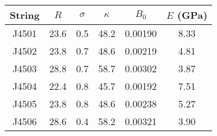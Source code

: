 \begin{tabular}{cccccc}
\toprule
String & $R$ & $\sigma$ & $\kappa$ & $B_0$ & $E$ (GPa) \\
\midrule
J4501 & 23.6 & 0.5 & 48.2 & 0.00190 & 8.33 \\
J4502 & 23.8 & 0.7 & 48.6 & 0.00219 & 4.81 \\
J4503 & 28.8 & 0.7 & 58.7 & 0.00302 & 3.87 \\
J4504 & 22.4 & 0.8 & 45.7 & 0.00192 & 7.51 \\
J4505 & 23.8 & 0.8 & 48.6 & 0.00238 & 5.27 \\
J4506 & 28.6 & 0.4 & 58.2 & 0.00321 & 3.90 \\
\bottomrule
\end{tabular}

